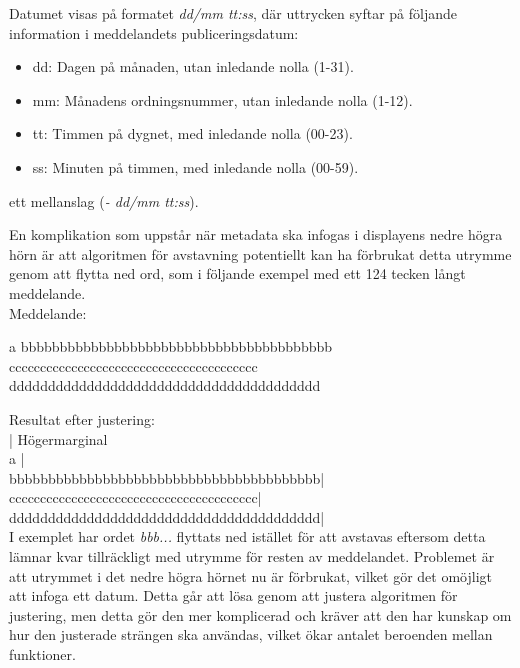\documentclass[a4paper,11pt]{article}
\begin{document}
Datumet visas på formatet {\it dd/mm tt:ss}, där uttrycken syftar på följande information i meddelandets publiceringsdatum:

	\begin{itemize}
    	\item dd: Dagen på månaden, utan inledande nolla (1-31).
    	\item mm: Månadens ordningsnummer, utan inledande nolla (1-12).
    	\item tt: Timmen på dygnet, med inledande nolla (00-23).
    	\item ss: Minuten på timmen, med inledande nolla (00-59).
    	\end{itemize}
    	
ett mellanslag ({\it - dd/mm tt:ss}).

En komplikation som uppstår när metadata ska infogas i displayens nedre högra hörn är att algoritmen för avstavning potentiellt kan ha förbrukat detta utrymme genom att flytta ned ord, som i följande exempel med ett 124 tecken långt meddelande. \\

Meddelande:

a bbbbbbbbbbbbbbbbbbbbbbbbbbbbbbbbbbbbbbbb \\ cccccccccccccccccccccccccccccccccccccccc  \\ dddddddddddddddddddddddddddddddddddddddd

Resultat efter justering: \\

                                      	| Högermarginal \\
a                                       | \\
bbbbbbbbbbbbbbbbbbbbbbbbbbbbbbbbbbbbbbbb| \\
cccccccccccccccccccccccccccccccccccccccc| \\
dddddddddddddddddddddddddddddddddddddddd| \\

I exemplet har ordet {\it bbb...} flyttats ned istället för att avstavas eftersom detta lämnar kvar tillräckligt med utrymme för resten av meddelandet. Problemet är att utrymmet i det nedre högra hörnet nu är förbrukat, vilket gör det omöjligt att infoga ett datum. Detta går att lösa genom att justera algoritmen för justering, men detta gör den mer komplicerad och kräver att den har kunskap om hur den justerade strängen ska användas, vilket ökar antalet beroenden mellan funktioner. \\
\end{document}
